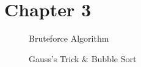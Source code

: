 \documentclass[12pt,a4paper]{article}
\begin{document}
\section{Chapter 3}
    \begin{figure}[!hbtp]
        \centering
        \caption{Bruteforce Algorithm}
    \end{figure}

    \begin{figure}[!hbtp]
        \centering
        \caption{Gauss's Trick \& Bubble Sort}
    \end{figure}
\end{document}
